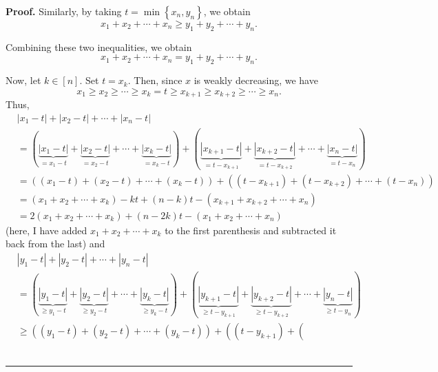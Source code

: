 \documentclass[numbers=enddot,12pt,final,onecolumn,notitlepage]{scrartcl}%
\numberwithin{exer}{subsection}
\theoremstyle{definition}
\newenvironment{proof}[1][Proof]{\noindent\textbf{#1.} }{\ \rule{0.5em}{0.5em}}
\begin{document}
\begin{proof}
Similarly, by taking $t=\min\left\{  x_{n},y_{n}\right\}  $, we obtain%
\[
x_{1}+x_{2}+\cdots+x_{n}\geq y_{1}+y_{2}+\cdots+y_{n}.
\]


Combining these two inequalities, we obtain%
\[
x_{1}+x_{2}+\cdots+x_{n}=y_{1}+y_{2}+\cdots+y_{n}.
\]


Now, let $k\in\left[  n\right]  $. Set $t=x_{k}$. Then, since $x$ is weakly
decreasing, we have%
\[
x_{1}\geq x_{2}\geq\cdots\geq x_{k}=t\geq x_{k+1}\geq x_{k+2}\geq\cdots\geq
x_{n}.
\]
Thus,%
\begin{align*}
& \left\vert x_{1}-t\right\vert +\left\vert x_{2}-t\right\vert +\cdots
+\left\vert x_{n}-t\right\vert \\
& =\left(  \underbrace{\left\vert x_{1}-t\right\vert }_{=x_{1}-t}%
+\underbrace{\left\vert x_{2}-t\right\vert }_{=x_{2}-t}+\cdots
+\underbrace{\left\vert x_{k}-t\right\vert }_{=x_{k}-t}\right)  +\left(
\underbrace{\left\vert x_{k+1}-t\right\vert }_{=t-x_{k+1}}%
+\underbrace{\left\vert x_{k+2}-t\right\vert }_{=t-x_{k+2}}+\cdots
+\underbrace{\left\vert x_{n}-t\right\vert }_{=t-x_{n}}\right)  \\
& =\left(  \left(  x_{1}-t\right)  +\left(  x_{2}-t\right)  +\cdots+\left(
x_{k}-t\right)  \right)  +\left(  \left(  t-x_{k+1}\right)  +\left(
t-x_{k+2}\right)  +\cdots+\left(  t-x_{n}\right)  \right)  \\
& =\left(  x_{1}+x_{2}+\cdots+x_{k}\right)  -kt+\left(  n-k\right)  t-\left(
x_{k+1}+x_{k+2}+\cdots+x_{n}\right)  \\
& =2\left(  x_{1}+x_{2}+\cdots+x_{k}\right)  +\left(  n-2k\right)  t-\left(
x_{1}+x_{2}+\cdots+x_{n}\right)
\end{align*}
(here, I have added $x_{1}+x_{2}+\cdots+x_{k}$ to the first parenthesis and
subtracted it back from the last) and%
\begin{align*}
& \left\vert y_{1}-t\right\vert +\left\vert y_{2}-t\right\vert +\cdots
+\left\vert y_{n}-t\right\vert \\
& =\left(  \underbrace{\left\vert y_{1}-t\right\vert }_{\geq y_{1}%
-t}+\underbrace{\left\vert y_{2}-t\right\vert }_{\geq y_{2}-t}+\cdots
+\underbrace{\left\vert y_{k}-t\right\vert }_{\geq y_{k}-t}\right)  +\left(
\underbrace{\left\vert y_{k+1}-t\right\vert }_{\geq t-y_{k+1}}%
+\underbrace{\left\vert y_{k+2}-t\right\vert }_{\geq t-y_{k+2}}+\cdots
+\underbrace{\left\vert y_{n}-t\right\vert }_{\geq t-y_{n}}\right)  \\
& \geq\left(  \left(  y_{1}-t\right)  +\left(  y_{2}-t\right)  +\cdots+\left(
y_{k}-t\right)  \right)  +\left(  \left(  t-y_{k+1}\right)  +\left(

\end{align*}
\end{proof}
\end{document}
